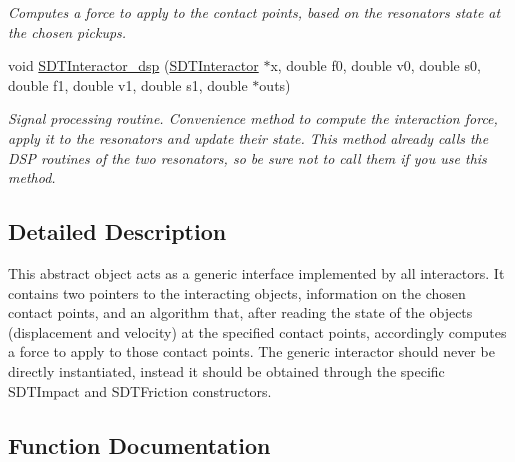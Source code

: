 \begin{DoxyCompactItemize}
\begin{DoxyCompactList}\small\item\em Computes a force to apply to the contact points, based on the resonators\textquotesingle{} state at the chosen pickups. \end{DoxyCompactList}\item 
void \hyperlink{group__interactor_ga78d5eab4115c38199cce2f45856d7fce}{S\+D\+T\+Interactor\+\_\+dsp} (\hyperlink{group__interactor_gacd68aba5c96532193d9cbc8dfa8f1c8c}{S\+D\+T\+Interactor} $\ast$x, double f0, double v0, double s0, double f1, double v1, double s1, double $\ast$outs)
\begin{DoxyCompactList}\small\item\em Signal processing routine. Convenience method to compute the interaction force, apply it to the resonators and update their state. This method already calls the D\+S\+P routines of the two resonators, so be sure not to call them if you use this method. \end{DoxyCompactList}\end{DoxyCompactItemize}


\subsection{Detailed Description}
This abstract object acts as a generic interface implemented by all interactors. It contains two pointers to the interacting objects, information on the chosen contact points, and an algorithm that, after reading the state of the objects (displacement and velocity) at the specified contact points, accordingly computes a force to apply to those contact points. The generic interactor should never be directly instantiated, instead it should be obtained through the specific S\+D\+T\+Impact and S\+D\+T\+Friction constructors. 

\subsection{Function Documentation}
\hypertarget{group__interactor_ga78d5eab4115c38199cce2f45856d7fce}{}
